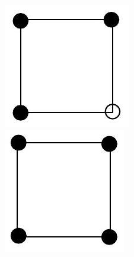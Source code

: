 \documentclass[10pt]{article}
\begin{document}
\includegraphics[max width=\textwidth, center]{2025_09_05_3ba26226ec0baddb5a03g-50(7)}\\
\includegraphics[max width=\textwidth, center]{2025_09_05_3ba26226ec0baddb5a03g-50(12)}
\end{document}
